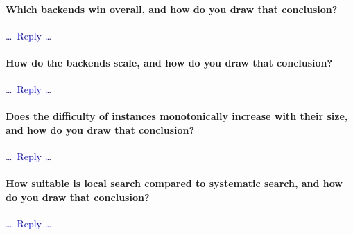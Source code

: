 \documentclass[a4paper,11pt,hidelinks]{article}
\renewcommand{\todo}[1]{\textcolor{blue}{#1}} %
\newcommand{\Problem}{\todo{Problem}\xspace}  %
\begin{document}
\begin{table}[t]
  \centering
  \caption{Results for our approach to \Problem,
    which is a \todo{minimisation / maximisation / satisfaction} problem.
    In each \texttt{time} column: if the reported time is less than
    the time-out (\TimeOut~milliseconds here), then the
    \todo{objective value in the corresponding \texttt{obj} column was
      \emph{proven} optimal};
    else the timing out is indicated by \texttt{t/o} and the
    \todo{objective value is either the best one found but \emph{not}
      proven optimal before timing out,
      or~`\texttt{-}' indicating that no feasible solution was found
      before timing out}.
    Boldface indicates the
    \todo{best performance (time or objective value)}
    on each row.
  }
  \label{tab:res}
\end{table}

\paragraph{Which backends win overall, and how do you draw that conclusion?}
\todo{\dots\ Reply \dots}

\paragraph{How do the backends scale, and how do you draw that conclusion?}
\todo{\dots\ Reply \dots}

\paragraph{Does the difficulty of instances monotonically increase
  with their size, and how do you draw that conclusion?}
\todo{\dots\ Reply \dots}

\paragraph{How suitable is local search compared to systematic search,
  and how do you draw that conclusion?}
\todo{\dots\ Reply \dots}
\end{document}

